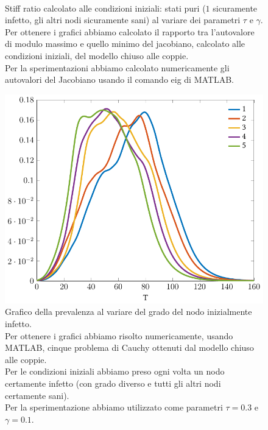 \begin{figure}[ht]
\centering
\subfloat[][$\gamma=0.10$]
{\resizebox{0.45\textwidth}{!}{}}
 \quad 
\subfloat[][$\gamma=0.30$]
{\resizebox{0.45\textwidth}{!}{ }}
\\
\subfloat[][$\gamma=0.50$]
{\resizebox{0.45\textwidth}{!}
{}}
\quad
\subfloat[][$\gamma=0.70$]
{\resizebox{0.45\textwidth}{!}
{}
}
\caption[Stiff ratio alle condizioni iniziali sulla rete stradale del Minnesota al variare dei parametri ]{Stiff ratio calcolato alle condizioni iniziali:  stati puri ($1$ sicuramente infetto, gli altri nodi sicuramente sani) al variare dei parametri $\tau$ e $\gamma$.\\ Per ottenere i grafici abbiamo calcolato il rapporto tra l'autovalore di modulo massimo e quello minimo del jacobiano, calcolato alle condizioni iniziali, del modello chiuso alle coppie.\\
Per la sperimentazioni abbiamo calcolato numericamente gli autovalori del Jacobiano usando il comando eig di MATLAB.}
\label{fig::minnesota_ratiostiff}
\end{figure}

\begin{figure}[htb]
\centering
\includegraphics[scale=0.45]{Figure/minnesota_prevalenza}
\caption[Grafico della prevalenza al variare del grado del nodo inizialmente infetto.]{Grafico della prevalenza al variare del grado del nodo inizialmente infetto.\\ Per ottenere i grafici abbiamo risolto numericamente, usando MATLAB, cinque problema di Cauchy ottenuti dal modello chiuso alle coppie.\\
Per le condizioni iniziali abbiamo preso ogni volta un nodo certamente infetto (con grado diverso e tutti gli altri nodi certamente sani).\\
Per la sperimentazione abbiamo utilizzato come parametri $\tau=0.3$ e $\gamma=0.1$.}
\label{fig::minnesota_prevalenza}
\end{figure}
